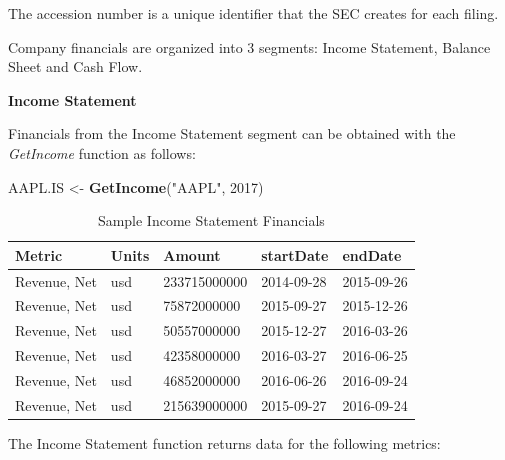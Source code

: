 \documentclass[]{book}
\newenvironment{Shaded}{\begin{snugshade}}{\end{snugshade}}
\newcommand{\KeywordTok}[1]{\textcolor[rgb]{0.13,0.29,0.53}{\textbf{#1}}}
\newcommand{\DecValTok}[1]{\textcolor[rgb]{0.00,0.00,0.81}{#1}}
\newcommand{\StringTok}[1]{\textcolor[rgb]{0.31,0.60,0.02}{#1}}
\newcommand{\NormalTok}[1]{#1}
\theoremstyle{definition}
\theoremstyle{definition}
\theoremstyle{definition}
\theoremstyle{remark}
\begin{document}
The accession number is a unique identifier that the SEC creates for
each filing.

Company financials are organized into 3 segments: Income Statement,
Balance Sheet and Cash Flow.

\textbf{Income Statement}

Financials from the Income Statement segment can be obtained with the
\emph{GetIncome} function as follows:

\begin{Shaded}
\begin{Highlighting}[]
\NormalTok{AAPL.IS <-}\StringTok{ }\KeywordTok{GetIncome}\NormalTok{(}\StringTok{"AAPL"}\NormalTok{, }\DecValTok{2017}\NormalTok{)}
\end{Highlighting}
\end{Shaded}

\begin{table}[t]

\caption{\label{tab:unnamed-chunk-25}Sample Income Statement Financials}
\centering
\begin{tabular}{lllll}
\toprule
Metric & Units & Amount & startDate & endDate\\
\midrule
Revenue, Net & usd & 233715000000 & 2014-09-28 & 2015-09-26\\
Revenue, Net & usd & 75872000000 & 2015-09-27 & 2015-12-26\\
Revenue, Net & usd & 50557000000 & 2015-12-27 & 2016-03-26\\
Revenue, Net & usd & 42358000000 & 2016-03-27 & 2016-06-25\\
Revenue, Net & usd & 46852000000 & 2016-06-26 & 2016-09-24\\
\addlinespace
Revenue, Net & usd & 215639000000 & 2015-09-27 & 2016-09-24\\
\bottomrule
\end{tabular}
\end{table}

The Income Statement function returns data for the following metrics:
\end{document}
